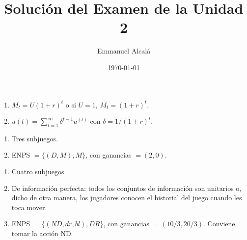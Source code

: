\documentclass[12pt]{article} %
\title{Solución del Examen de la Unidad 2}
\author{Emmanuel Alcalá}
\date{\today}
\begin{document}
\maketitle

\begin{Exercise}[name={Respuesta}]

  \begin{enumerate}
    \setlength{\itemsep}{0pt}
    \setlength{\parskip}{0pt}
    \setlength{\parsep}{0pt}
    \item $ M_t = U(1+r)^t $ o si $ U=1 $, $ M_t = (1+r)^t $.
    \item $ u(t) = \sum_{t=1}^{\infty} \delta^{t-1}u^{(t)}$ con $ \delta = 1/(1+r)^t $.
  \end{enumerate}

\end{Exercise}

\begin{Exercise}[name={Respuesta}]

  \begin{enumerate}
    \setlength{\itemsep}{0pt}
    \setlength{\parskip}{0pt}
    \setlength{\parsep}{0pt}
    \item Tres subjuegos.
    \item ENPS $ = \{ (D,M),M \}$, con ganancias $ = (2, 0) $.
  \end{enumerate}

\end{Exercise}

\begin{Exercise}[name={Respuesta}]

  \begin{enumerate}
    \setlength{\itemsep}{0pt}
    \setlength{\parskip}{0pt}
    \setlength{\parsep}{0pt}
    \item Cuatro subjuegos.
    \item De información perfecta: todos los conjuntos de información son unitarios o, dicho de otra manera, los jugadores conocen el historial del juego cuando les toca mover.
    \item ENPS $ = \{ (ND,dr, bl),DR \}$, con ganancias $ = (10/3, 20/3) $. Conviene tomar la acción ND.
  \end{enumerate}

\end{Exercise}
\end{document}
